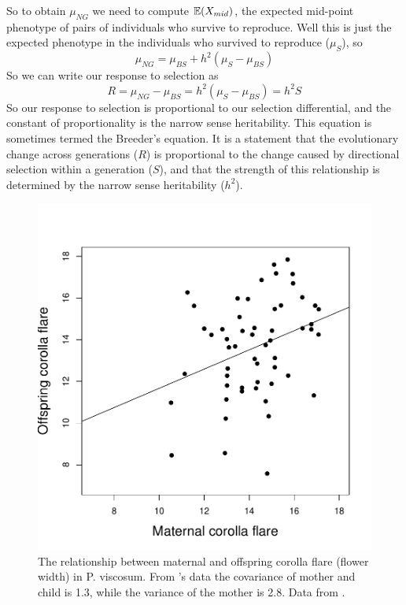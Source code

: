 So to obtain $\mu_{NG}$ we need to compute $\mathbb{E}(X_{mid})$, the expected
mid-point phenotype of pairs of individuals who survive to
reproduce. Well this is just the expected phenotype in the individuals
who survived to reproduce ($\mu_{S}$), so
\begin{equation}
\mu_{NG} = \mu_{BS} +
h^2 (\mu_S - \mu_{BS})
\end{equation}
So we can write our response to selection as
\begin{equation}
R = \mu_{NG} -\mu_{BS}  =
h^2 (\mu_S - \mu_{BS}) = h^2 S \label{breeders_eqn}
\end{equation}
So our response to selection is proportional to our selection
differential, and the constant of proportionality is the narrow sense
heritability. This equation is sometimes termed the Breeder's
equation. It is a statement that the evolutionary change across
generations ($R$) is proportional to the change caused by directional selection
within a generation ($S$), and that the strength of this relationship is
determined by the narrow sense heritability ($h^2$). \\




\begin{figure}
\begin{center}
\includegraphics[width= 0.6 \textwidth]{Journal_figs/Quant_gen/Galen_flower_herit/Galen_corolla_flare.pdf} 
\end{center}
\caption{The relationship between maternal and offspring corolla flare (flower
  width) in P. viscosum. From \citeauthor{galen:96}'s data the
  covariance of mother and child is 1.3, while the variance of the
  mother is 2.8. Data from \citet{galen:96}. } \label{fig:Galen_corolla}  
\end{figure}

